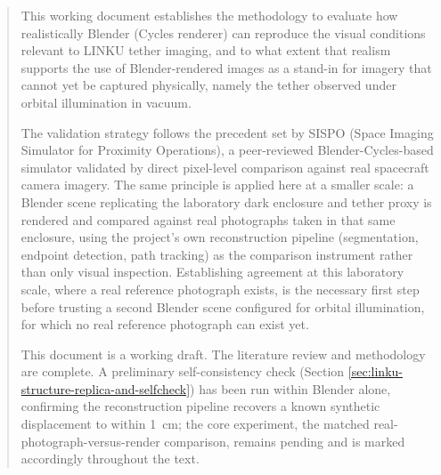 \documentclass[a4paper, twoside]{report}
\begin{document}


\begin{abstract}
This working document establishes the methodology to evaluate how realistically Blender (Cycles renderer) can reproduce the visual conditions relevant to LINKU tether imaging, and to what extent that realism supports the use of Blender-rendered images as a stand-in for imagery that cannot yet be captured physically, namely the tether observed under orbital illumination in vacuum.

The validation strategy follows the precedent set by SISPO (Space Imaging Simulator for Proximity Operations), a peer-reviewed Blender-Cycles-based simulator validated by direct pixel-level comparison against real spacecraft camera imagery. The same principle is applied here at a smaller scale: a Blender scene replicating the laboratory dark enclosure and tether proxy is rendered and compared against real photographs taken in that same enclosure, using the project's own reconstruction pipeline (segmentation, endpoint detection, path tracking) as the comparison instrument rather than only visual inspection. Establishing agreement at this laboratory scale, where a real reference photograph exists, is the necessary first step before trusting a second Blender scene configured for orbital illumination, for which no real reference photograph can exist yet.

This document is a working draft. The literature review and methodology are complete. A preliminary self-consistency check (Section \ref{sec:linku-structure-replica-and-selfcheck}) has been run within Blender alone, confirming the reconstruction pipeline recovers a known synthetic displacement to within 1~cm; the core experiment, the matched real-photograph-versus-render comparison, remains pending and is marked accordingly throughout the text.
\end{abstract}

\tableofcontents
\listoffigures
\listoftables










\end{document}
